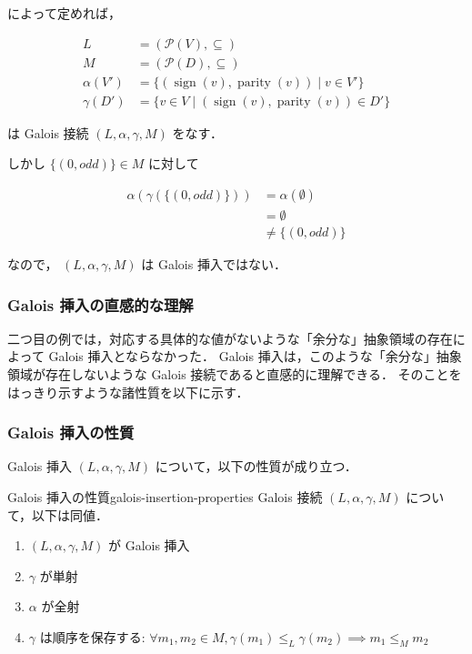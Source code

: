 \documentclass[uplatex]{jsarticle}
\begin{document}
によって定めれば，

\begin{align*}
  L          & = (\mathcal{P}(V), \subseteq)                                                  \\
  M          & = (\mathcal{P}(D), \subseteq)                                                  \\
  \alpha(V') & = \{ (\operatorname{sign}(v), \operatorname{parity}(v)) \mid v \in V' \}       \\
  \gamma(D') & = \{ v \in V \mid (\operatorname{sign}(v), \operatorname{parity}(v)) \in D' \}
\end{align*}

は Galois 接続 $(L, \alpha, \gamma, M)$ をなす．

しかし $\{ (\mathord{0}, \mathord{odd}) \} \in M$ に対して

\begin{align*}
  \alpha(\gamma(\{ (\mathord{0}, \mathord{odd}) \})) & = \alpha( \emptyset )                   \\
                                                     & = \emptyset                             \\
                                                     & \neq \{ (\mathord{0}, \mathord{odd}) \}
\end{align*}

なので， $(L, \alpha, \gamma, M)$ は Galois 挿入ではない．

\subsubsection{Galois 挿入の直感的な理解}

二つ目の例では，対応する具体的な値がないような「余分な」抽象領域の存在によって Galois 挿入とならなかった．
Galois 挿入は，このような「余分な」抽象領域が存在しないような Galois 接続であると直感的に理解できる．
そのことをはっきり示すような諸性質を以下に示す．

\subsubsection{Galois 挿入の性質}

Galois 挿入 $(L, \alpha, \gamma, M)$ について，以下の性質が成り立つ．

\begin{boxtheorem}{Galois 挿入の性質}{galois-insertion-properties}
  Galois 接続 $(L, \alpha, \gamma, M)$ について，以下は同値．

  \begin{enumerate}[label=\roman*.]
    \item $(L, \alpha, \gamma, M)$ が Galois 挿入
    \item $\gamma$ が単射
    \item $\alpha$ が全射
    \item $\gamma$ は順序を保存する: $\forall m_1, m_2 \in M, \gamma(m_1) \leq_L \gamma(m_2) \implies m_1 \leq_M m_2$
  \end{enumerate}
\end{boxtheorem}
\end{document}
